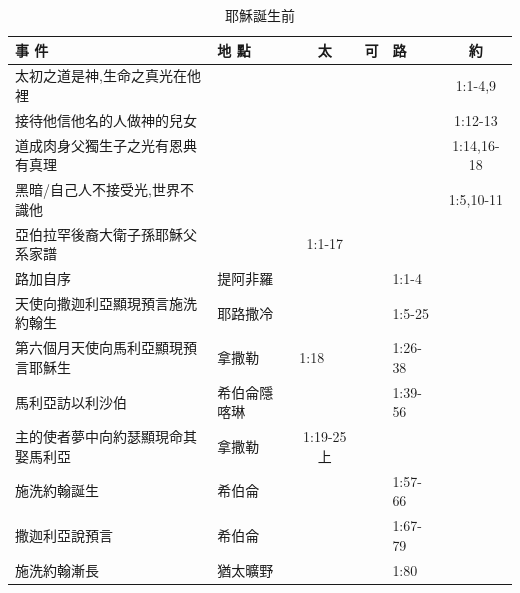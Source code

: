 \begin{table}[H]
\centering
\begin{tabular}{p{17.93em}|p{6.07em}|c|c|l|c} \toprule
 事 件   & 地 點   & \multicolumn{1}{p{5em}|}{太} & \multicolumn{1}{p{4.215em}|}{可} & \multicolumn{1}{p{4.215em}|}{路} & \multicolumn{1}{p{4.215em}}{約} \\
\midrule
太初之道是神,生命之真光在他裡&&\multicolumn{1}{p{4.215em}|}{}& & &1:1-4,9\\\midrule 
接待他信他名的人做神的兒女&&\multicolumn{1}{p{4.215em}|}{}& & &1:12-13\\\midrule 
道成肉身父獨生子之光有恩典有真理&&\multicolumn{1}{p{4.215em}|}{}& & &1:14,16-18\\\midrule 
黑暗/自己人不接受光,世界不識他&&\multicolumn{1}{p{4.215em}|}{}& & &1:5,10-11\\\midrule 
亞伯拉罕後裔大衛子孫耶穌父系家譜&&\multicolumn{1}{p{4.215em}|}{1:1-17}& & &  \\\midrule 
路加自序&提阿非羅&       &       & \multicolumn{1}{p{4.215em}|}{1:1-4} &  \\\midrule 
天使向撒迦利亞顯現預言施洗約翰生& 耶路撒冷  &       &       & \multicolumn{1}{p{4.215em}|}{1:5-25} &  \\\midrule 

第六個月天使向馬利亞顯現預言耶穌生& 拿撒勒   & \multicolumn{1}{l|}{1:18} &       & \multicolumn{1}{p{4.215em}|}{1:26-38} &  \\\midrule

馬利亞訪以利沙伯 & 希伯侖隱喀琳   &       &       & \multicolumn{1}{p{4.215em}|}{1:39-56} &  \\\midrule

主的使者夢中向約瑟顯現命其娶馬利亞& 拿撒勒   & \multicolumn{1}{p{5em}|}{1:19-25上} &       &       &  \\\midrule

施洗約翰誕生 & 希伯侖   &       &       & \multicolumn{1}{p{4.215em}|}{1:57-66} &  \\\midrule

撒迦利亞說預言 & 希伯侖   &       &       & \multicolumn{1}{p{4.215em}|}{1:67-79} &  \\\midrule

施洗約翰漸長 & 猶太曠野  &       &       & 1:80 &  \\ \bottomrule
\end{tabular}%
\caption{耶穌誕生前}
  \label{tab:addlabel}%
\end{table}%





